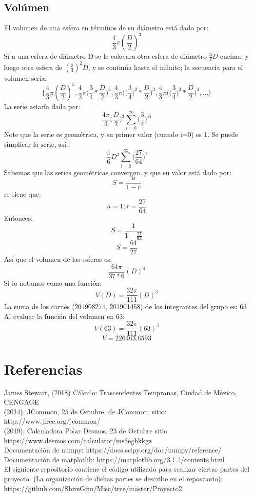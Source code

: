 \documentclass{article}
\begin{document}
\newpage
\subsection{Volúmen}
El volumen de una esfera en términos de su diámetro está dado por:
\[
	\frac{4}{3}\pi(\frac{D}{2})^3
\]
Sí a una esfera de diámetro D se le colocara otra esfera de diámetro $ \frac{3}{4}D $ encima, y luego otra esfera de $ (\frac{3}{4})^2D $, y se continúa hasta el infinito; la secuencia para el volumen sería:
\[
	\Bigg\{\frac{4}{3}\pi(\frac{D}{2})^3, \frac{4}{3}\pi\Big(\frac{3}{4}*\frac{D}{2}\Big)^3, \frac{4}{3}\pi\Big(\Big(\frac{3}{4}\Big)^2*\frac{D}{2}\Big)^3, \frac{4}{3}\pi\Big(\Big(\frac{3}{4}\Big)^3*\frac{D}{2}\Big)^3, ... \Bigg\}
\]
La serie estaría dada por:
\[
	\frac{4\pi}{3}\Big(\frac{D}{2}\Big)^3\sum_{i=0}^{\infty}{\Big(\frac{3}{4}\Big)^{3i}}
\]
Note que la serie es geométrica, y su primer valor (cuando i=0) es 1.
Se puede simplicar la serie, así:
\[
	\frac{\pi}{6}D^3\sum_{i=0}^{\infty}{\Big(\frac{27}{64}\Big)^{i}}
\]
Sabemos que las series geométricas convergen, y que su valor está dado por: $$ S = \frac{a}{1 - r} $$ se tiene que: $$ a = 1 ; r = \frac{27}{64}$$ Entonces: $$ S = \frac{1}{1-\frac{27}{64}} $$ $$ S = \frac{64}{27}$$
Así que el volumen de las esferas es: 
\[
	\frac{64\pi}{37*6}(D)^3
\]
Si lo notamos como una función:
\[
	V(D) = \frac{32\pi}{111}(D)^3
\]
La suma de los carnés (201908274, 201901458) de los integrantes del grupo es: 63
Al evaluar la función del volumen en 63:
\[
	V(63) = \frac{32\pi}{111}(63)^3
\]
\[
	V = 226463.6593
\]
\newpage

\section{Referencias}
James Stewart, (2018) Cálculo: Trascendentes Tempranas, Ciudad de México, CENGAGE\\
(2014), JCommon, 25 de Octubre, de JCommon, sitio: http://www.jfree.org/jcommon/\\
(2019), Calculadora Polar Desmos, 23 de Octubre sitio\\
https://www.desmos.com/calculator/ms3eghkkgz\\
Documentación de numpy: https://docs.scipy.org/doc/numpy/reference/\\
Documentación de matplotlib: https://matplotlib.org/3.1.1/contents.html\\
El siguiente repositorio contiene el código utilizado para realizar ciertas partes del proyecto. (La organización de dichas partes se describe en el repositorio):\\https://github.com/ShireGrin/Misc/tree/master/Proyecto2
\end{document}
